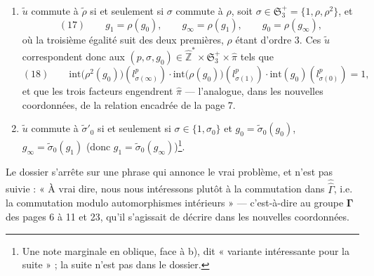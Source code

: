 \documentclass[11pt,a4paper]{article}
\begin{document}
\begin{enumerate}
\item[a)] $\tilde u$ commute à $\tilde\rho$ si et seulement si $\sigma$ commute
à $\rho$, soit $\sigma \in \mathfrak{S}_3^{+} = \{1, \rho, \rho^2\}$, et
\[
(17)\qquad g_1 = \rho(g_0), \qquad g_\infty = \rho(g_1), \qquad g_0 =
\rho(g_\infty),
\]
où la troisième égalité suit des deux premières, $\rho$ étant d'ordre $3$. Ces
$\tilde u$ correspondent donc aux $(p, \sigma, g_0) \in
\widehat{\mathbb{Z}}^{*} \times \mathfrak{S}_3^{+} \times \widehat{\pi}$ tels que
\[
(18)\qquad \mathrm{int}\bigl(\rho^2(g_0)\bigr)(l_{\sigma(\infty)}^{p}) \cdot
\mathrm{int}\bigl(\rho(g_0)\bigr)(l_{\sigma(1)}^{p}) \cdot
\mathrm{int}(g_0)(l_{\sigma(0)}^{p}) = 1,
\]
et que les trois facteurs engendrent $\widehat{\pi}$ — l'analogue, dans les
nouvelles coordonnées, de la relation encadrée de la page 7.
\item[b)] $\tilde u$ commute à $\tilde\sigma'_0$ si et seulement si $\sigma \in
\{1, \sigma_0\}$ et $g_0 = \tilde\sigma_0(g_0)$, $g_\infty = \tilde\sigma_0(g_1)$
(donc $g_1 = \tilde\sigma_0(g_\infty)$)\footnote{Une note marginale en oblique,
face à b), dit « variante intéressante pour la suite » ; la suite n'est pas
dans le dossier.}.
\end{enumerate}

Le dossier s'arrête sur une phrase qui annonce le vrai problème, et n'est pas
suivie : « À vrai dire, nous nous intéressons plutôt à la commutation dans
$\hat{\hat\Gamma}$, i.e. la commutation modulo automorphismes intérieurs » —
c'est-à-dire au groupe $\boldsymbol{\Gamma}$ des pages 6 à 11 et 23, qu'il
s'agissait de décrire dans les nouvelles coordonnées.
\end{document}
